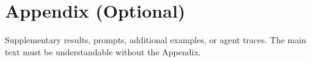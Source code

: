 \documentclass[11pt]{article}
\begin{document}

% 

\appendix
\section*{Appendix (Optional)}

Supplementary results, prompts, additional examples, or agent traces. The main text
must be understandable without the Appendix.
\end{document}
